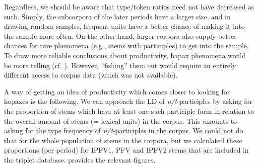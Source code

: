 \documentclass[output=paper]{langscibook}
\begin{document}
Regardless, we should be aware that type/token ratios need not have decreased as such. Simply, the subcorpora of the later periods have a larger size, and in drawing random samples, frequent units have a better chance of making it into the sample more often. On the other hand, larger corpora also supply better chances for rare phenomena (e.g., stems with participles) to get into the sample. To draw more reliable conclusions about productivity, hapax phenomena would be more telling (cf. \citealt{Baayen2009}). However, “fishing” them out would require an entirely different access to corpus data (which was not available).\largerpage[-1]

A way of getting an idea of productivity which comes closer to looking for hapaxes is the following. We can approach the LD of \textit{n/t}-participles by asking for the proportion of stems which have at least one such participle form in relation to the overall amount of stems (= lexical units) in the corpus. This amounts to asking for the type frequency of \textit{n/t}-participles in the corpus. We could not do that for the whole population of stems in the corpora, but we calculated these proportions (per period) for IPFV1, PFV and IPFV2 stems that are included in the triplet database.  provides the relevant figures.
\end{document}
